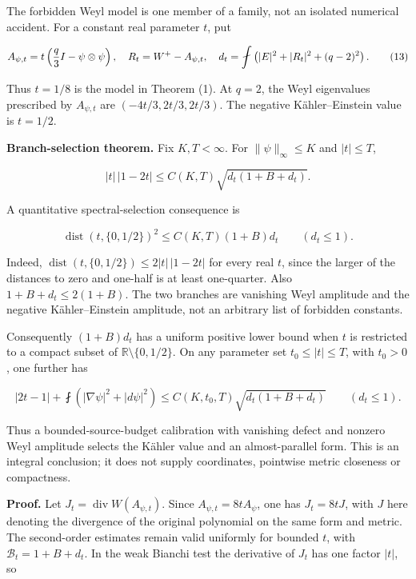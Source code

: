 \documentclass[
  10pt,
]{article}
\begin{document}
The forbidden Weyl model is one member of a family, not an isolated
numerical accident. For a constant real parameter \(t\), put

\[
 A_{\psi,t}=t\left({q\over3}I-\psi\otimes\psi\right),
 \quad R_t=W^+-A_{\psi,t},\quad
 d_t=\fint\left(|E|^2+|R_t|^2+(q-2)^2\right).
                                                               \tag{13}
\]

Thus \(t=1/8\) is the model in Theorem (1). At \(q=2\), the Weyl
eigenvalues prescribed by \(A_{\psi,t}\) are \((-4t/3,2t/3,2t/3)\). The
negative Kähler--Einstein value is \(t=1/2\).

\textbf{Branch-selection theorem.} Fix \(K,T<\infty\). For
\(\|\psi\|_\infty\le K\) and \(|t|\le T\),

\[
 \boxed{\quad |t|\,|1-2t|\le C(K,T)
                  \sqrt{d_t(1+B+d_t)}.\quad}             \tag{14}
\]

A quantitative spectral-selection consequence is

\[
 \boxed{\quad
 \operatorname{dist}(t,\{0,1/2\})^2
       \le C(K,T)(1+B)d_t\qquad(d_t\le1).
 \quad}                                                   \tag{14a}
\]

Indeed, \(\operatorname{dist}(t,\{0,1/2\})\le2|t|\,|1-2t|\) for every
real \(t\), since the larger of the distances to zero and one-half is at
least one-quarter. Also \(1+B+d_t\le2(1+B)\). The two branches are
vanishing Weyl amplitude and the negative Kähler--Einstein amplitude,
not an arbitrary list of forbidden constants.

Consequently \((1+B)d_t\) has a uniform positive lower bound when \(t\)
is restricted to a compact subset of \(\mathbb R\setminus\{0,1/2\}\). On
any parameter set \(t_0\le|t|\le T\), with \(t_0>0\), one further has

\[
 |2t-1|+\fint\left(|\nabla\psi|^2+|d\psi|^2\right)
 \le C(K,t_0,T)\sqrt{d_t(1+B+d_t)}\qquad(d_t\le1).       \tag{15}
\]

Thus a bounded-source-budget calibration with vanishing defect and
nonzero Weyl amplitude selects the Kähler value and an almost-parallel
form. This is an integral conclusion; it does not supply coordinates,
pointwise metric closeness or compactness.

\textbf{Proof.} Let \(J_t=\operatorname{div}W(A_{\psi,t})\). Since
\(A_{\psi,t}=8tA_\psi\), one has \(J_t=8tJ\), with \(J\) here denoting
the divergence of the original polynomial on the same form and metric.
The second-order estimates remain valid uniformly for bounded \(t\),
with \(\mathcal B_t=1+B+d_t\). In the weak Bianchi test the derivative
of \(J_t\) has one factor \(|t|\), so
\end{document}
